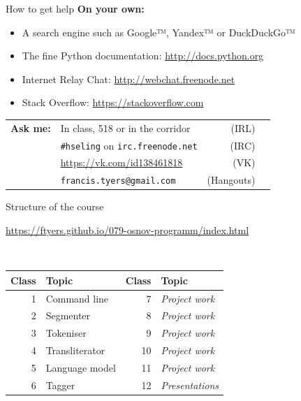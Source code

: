 \documentclass[10pt, compress]{beamer}
\begin{document}
\begin{frame}{How to get help}
\textbf{On your own:}
\begin{itemize}
  \item A search engine such as Google™, Yandex™ or DuckDuckGo™
  \item The fine Python documentation: \url{http://docs.python.org}
  \item Internet Relay Chat: \url{http://webchat.freenode.net}
  \item Stack Overflow: \url{https://stackoverflow.com}
\end{itemize}

\begin{center}
\begin{tabularx}{\textwidth}{lXrl}
   \textbf{Ask me:} &       In class, 518 or in the corridor & (IRL) \\
                 & {\tt \#hseling} on {\tt irc.freenode.net} & (IRC) \\
                 & \url{https://vk.com/id138461818} & (VK) \\
                 & {\tt francis.tyers@gmail.com} & (Hangouts) \\ 
\end{tabularx}
\end{center}

\end{frame}

\begin{frame}{Structure of the course}

\begin{center}
\url{https://ftyers.github.io/079-osnov-programm/index.html}
\end{center}
~\\
\begin{center}
\begin{tabular}{rlrl}
\textbf{Class} & \textbf{Topic}   & \textbf{Class} & \textbf{Topic} \\
\hline
1  & Command line & 7   & \emph{Project work}  \\
2  & Segmenter & 8   &  \emph{Project work} \\
3  & Tokeniser & 9   &  \emph{Project work} \\
4  & Transliterator & 10   &  \emph{Project work} \\
5  & Language model & 11   & \emph{Project work}  \\
6  & Tagger & 12   & \emph{Presentations}  \\
\end{tabular}
\end{center}


\end{frame}
\end{document}
